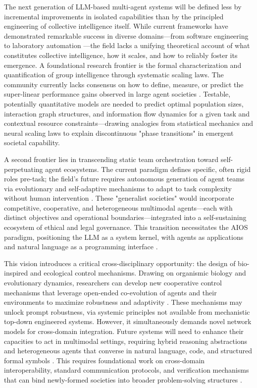 \documentclass[11pt,a4paper]{article}
\begin{document}
The next generation of LLM-based multi-agent systems will be defined less by incremental improvements in isolated capabilities than by the principled engineering of collective intelligence itself. While current frameworks have demonstrated remarkable success in diverse domains---from software engineering to laboratory automation \cite{arxiv:2406.11638v1,arxiv:2208.09099v3}---the field lacks a unifying theoretical account of what constitutes collective intelligence, how it scales, and how to reliably foster its emergence. A foundational research frontier is the formal characterization and quantification of group intelligence through systematic scaling laws. The community currently lacks consensus on how to define, measure, or predict the super-linear performance gains observed in large agent societies \cite{arxiv:2404.02183v1,arxiv:2407.17789v1}. Testable, potentially quantitative models are needed to predict optimal population sizes, interaction graph structures, and information flow dynamics for a given task and contextual resource constraints---drawing analogies from statistical mechanics and neural scaling laws to explain discontinuous "phase transitions" in emergent societal capability.

A second frontier lies in transcending static team orchestration toward self-perpetuating agent ecosystems. The current paradigm defines specific, often rigid roles pre-task; the field's future requires autonomous generation of agent teams via evolutionary and self-adaptive mechanisms to adapt to task complexity without human intervention \cite{arxiv:2406.14228v2,arxiv:2307.06187v1}. These "generalist societies" would incorporate competitive, cooperative, and heterogeneous multimodal agents---each with distinct objectives and operational boundaries---integrated into a self-sustaining ecosystem of ethical and legal governance. This transition necessitates the AIOS paradigm, positioning the LLM as a system kernel, with agents as applications and natural language as a programming interface \cite{arxiv:2312.03815v2}.

This vision introduces a critical cross-disciplinary opportunity: the design of bio-inspired and ecological control mechanisms. Drawing on organismic biology and evolutionary dynamics, researchers can develop new cooperative control mechanisms that leverage open-ended co-evolution of agents and their environments to maximize robustness and adaptivity \cite{arxiv:2309.07864v3}. These mechanisms may unlock prompt robustness, via systemic principles not available from mechanistic top-down engineered systems. However, it simultaneously demands novel network models for cross-domain integration. Future systems will need to enhance their capacities to act in multimodal settings, requiring hybrid reasoning abstractions and heterogeneous agents that converse in natural language, code, and structured formal symbols \cite{arxiv:2401.03428v1}. This requires foundational work on cross-domain interoperability, standard communication protocols, and verification mechanisms that can bind newly-formed societies into broader problem-solving structures \cite{arxiv:2404.04834v1,arxiv:2403.16971v2}.
\end{document}
